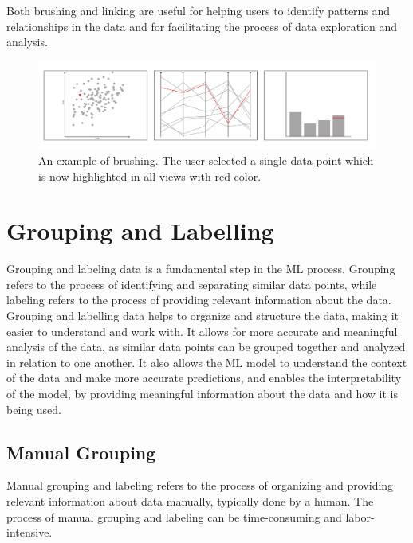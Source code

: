 Both brushing and linking are useful for helping users to identify
patterns and relationships in the data and for facilitating the
process of data exploration and analysis.

\begin{figure}[tp]
\centering
\includegraphics[frame,keepaspectratio,width=\linewidth,height=\halfh]
{diagrams/brushing.pdf}

\caption[Brushing]
{ An example of brushing. The user selected a single data point which
is now highlighted in all views with red color.
}
\label{fig:BrushingDiagram}
\end{figure}




\section{Grouping and Labelling}

Grouping and labeling data is a fundamental step in the ML process.
Grouping refers to the process of identifying and separating similar data
points, while labeling refers to the process of providing relevant
information about the data. Grouping and labelling data helps to organize
and structure the data, making it easier to understand and work with. It
allows for more accurate and meaningful analysis of the data, as similar
data points can be grouped together and analyzed in relation to one
another. It also allows the ML model to understand the context of the data
and make more accurate predictions, and enables the interpretability of
the model, by providing meaningful information about the data and how it
is being used.

\subsection{Manual Grouping}

Manual grouping and labeling refers to the process of organizing and
providing relevant information about data manually, typically done by a
human. The process of manual grouping and labeling can be time-consuming
and labor-intensive.




